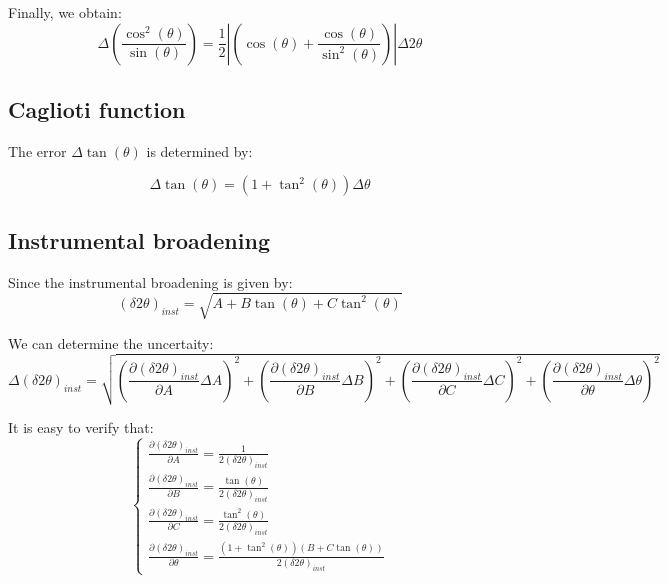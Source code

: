 \documentclass[12pt]{article}
\begin{document}
Finally, we obtain: 
\begin{equation}
    \Delta \left( \frac{\cos^2(\theta)}{\sin(\theta)} \right) = \frac{1}{2} \left| \left( \cos(\theta) + \frac{\cos(\theta)}{\sin^2(\theta)} \right)  \right| \Delta 2 \theta
\end{equation}


\subsection{Caglioti function}

The error $\Delta \tan(\theta)$ is determined by:

\begin{equation}
    \Delta \tan(\theta) = (1+\tan^2(\theta)) \Delta \theta
\end{equation}

\subsection{Instrumental broadening}

Since the instrumental broadening is given by:
\begin{equation}
    (\delta 2 \theta)_{inst} = \sqrt{A+B\tan(\theta)+C\tan^2(\theta)}
\end{equation}

We can determine the uncertaity:
\begin{equation}    
    \Delta (\delta 2 \theta)_{inst} = \sqrt{\left( \frac{\partial (\delta 2 \theta)_{inst}}{\partial A} \Delta A \right)^2 + \left( \frac{\partial (\delta 2 \theta)_{inst}}{\partial B} \Delta B \right)^2 + \left( \frac{\partial (\delta 2 \theta)_{inst}}{\partial C} \Delta C \right)^2 + \left( \frac{\partial (\delta 2 \theta)_{inst}}{\partial \theta} \Delta \theta \right)^2}
\end{equation}

It is easy to verify that:
\begin{equation}
    \begin{cases}
        \frac{\partial (\delta 2 \theta)_{inst}}{\partial A} = \frac{1}{2(\delta 2 \theta)_{inst}} \\
        \frac{\partial (\delta 2 \theta)_{inst}}{\partial B} = \frac{\tan(\theta)}{2(\delta 2 \theta)_{inst}} \\
        \frac{\partial (\delta 2 \theta)_{inst}}{\partial C} = \frac{\tan^2(\theta)}{2(\delta 2 \theta)_{inst}} \\
        \frac{\partial (\delta 2 \theta)_{inst}}{\partial \theta} = \frac{(1+\tan^2(\theta))(B + C\tan(\theta))}{2(\delta 2 \theta)_{inst}}
    \end{cases}
\end{equation}
\end{document}
